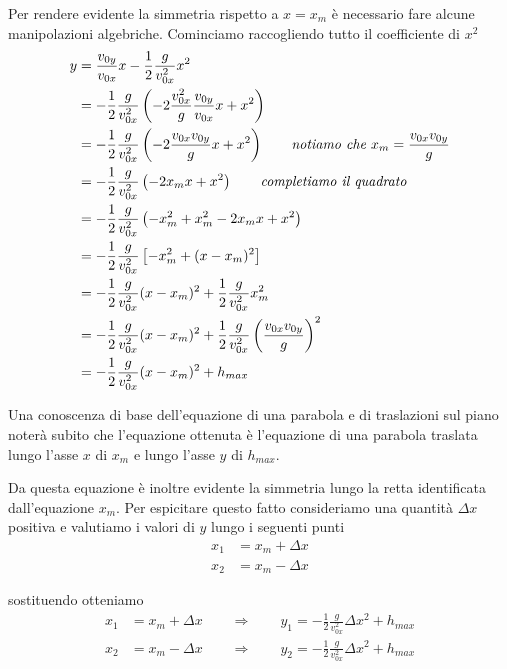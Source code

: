 \documentclass{article}
\begin{document}
Per rendere evidente la simmetria rispetto a $x=x_m$ è necessario fare alcune manipolazioni algebriche. Cominciamo raccogliendo tutto il coefficiente di $x^2$
\begin{align}
  y &= \frac{v_{0y}}{v_{0x}} x - \frac{1}{2}\frac{g}{v_{0x}^2}x^2 \\
    &= -\frac{1}{2}\frac{g}{v_{0x}^2} \left(-2\frac{v_{0x}^2}{g}\frac{v_{0y}}{v_{0x}}x + x^2\right) \\
    &= -\frac{1}{2}\frac{g}{v_{0x}^2} \left(-2\frac{v_{0x}v_{0y}}{g}x + x^2\right) \qquad\text{\textit{notiamo che $x_m=\frac{v_{0x}v_{0y}}{g}$}} \\
    &= -\frac{1}{2}\frac{g}{v_{0x}^2} \left(-2x_mx + x^2\right) \qquad \text{\textit{completiamo il quadrato}} \\
    &= -\frac{1}{2}\frac{g}{v_{0x}^2} \left(-x_m^2 + x_m^2 -2x_mx + x^2\right) \\
    &= -\frac{1}{2}\frac{g}{v_{0x}^2} \left[-x_m^2 + (x-x_m)^2\right] \\
    &= -\frac{1}{2}\frac{g}{v_{0x}^2} (x-x_m)^2 + \frac{1}{2}\frac{g}{v_{0x}^2}x_m^2 \\
    &= -\frac{1}{2}\frac{g}{v_{0x}^2} (x-x_m)^2 + \frac{1}{2}\frac{g}{v_{0x}^2}\left(\frac{v_{0x}v_{0y}}{g}\right)^2 \\
    &= -\frac{1}{2}\frac{g}{v_{0x}^2} (x-x_m)^2 + h_{max}
\end{align}

Una conoscenza di base dell'equazione di una parabola e di traslazioni sul piano noterà subito che l'equazione ottenuta è l'equazione di una parabola traslata lungo l'asse $x$ di $x_m$ e lungo l'asse $y$ di $h_{max}$.

Da questa equazione è inoltre evidente la simmetria lungo la retta identificata dall'equazione $x_m$. Per espicitare questo fatto consideriamo una quantità $\Delta x$ positiva e valutiamo i valori di $y$ lungo i seguenti punti
\begin{align}
  x_1 &= x_m + \Delta x \\
  x_2 &= x_m - \Delta x
\end{align}

sostituendo otteniamo
\begin{align}
  x_1 &= x_m + \Delta x \qquad \Rightarrow \qquad y_1 = -\frac{1}{2}\frac{g}{v_{0x}^2} \Delta x^2 + h_{max} \\
  x_2 &= x_m - \Delta x \qquad \Rightarrow \qquad y_2 = -\frac{1}{2}\frac{g}{v_{0x}^2} \Delta x^2 + h_{max}
\end{align}
\end{document}
